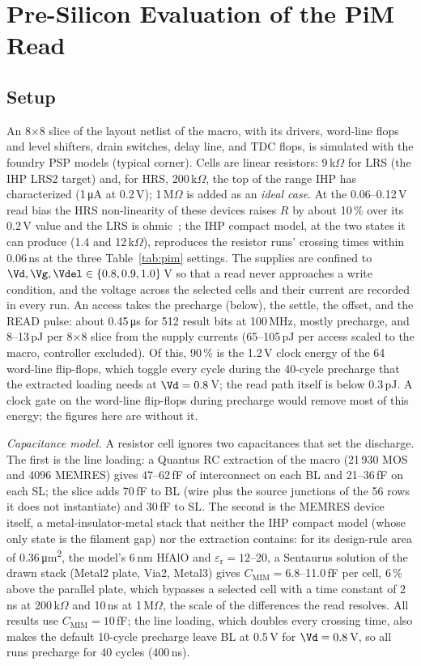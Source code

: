 \section{Pre-Silicon Evaluation of the PiM Read}
\label{sec:results}
\subsection{Setup}
An 8$\times$8 slice of the layout netlist of the macro, with its drivers, word-line flops and level
shifters, drain switches, delay line, and TDC flops, is simulated with the foundry PSP models
(typical corner). Cells are linear resistors:
9\,k$\Omega$ for LRS (the IHP LRS2 target) and, for HRS, 200\,k$\Omega$, the top of the
range IHP has characterized (1\,\si{\micro\ampere} at 0.2\,V); 1\,M$\Omega$ is added as an \emph{ideal case}. At the 0.06--0.12\,V read bias the HRS non-linearity of
these devices raises $R$ by about 10\,\% over its 0.2\,V value and the LRS is ohmic~\cite{zanotti2026model}; the IHP
compact model, at the two states it can produce (1.4 and 12\,k$\Omega$), reproduces the resistor
runs' crossing times within 0.06\,ns at the three Table~\ref{tab:pim} settings.
The supplies are confined to
$\Vd,\Vg,\Vdel\in\{0.8,0.9,1.0\}$\,V so that a read never approaches a write condition, and the
voltage across the selected cells and their current are recorded in every run. An access takes
the precharge (below), the settle, the offset, and the READ pulse: about 0.45\,\si{\micro\second}
for 512 result bits at 100\,MHz, mostly precharge, and 8--13\,pJ per 8$\times$8 slice from the supply currents (65--105\,pJ per access
scaled to the macro, controller excluded). Of this, 90\,\% is the 1.2\,V clock energy of the 64 word-line flip-flops, which toggle every
cycle during the 40-cycle precharge that the extracted loading needs at $\Vd=0.8$\,V; the read path itself is below 0.3\,pJ. A clock gate on the word-line flip-flops during
precharge would remove most of this energy; the figures here are without it.

\textit{Capacitance model.} A resistor cell ignores two capacitances that set the discharge. The
first is the line loading: a Quantus RC extraction of the macro (21\,930 MOS and 4096 MEMRES)
gives 47--62\,fF of interconnect on each BL and 21--36\,fF on each SL; the slice adds 70\,fF to
BL (wire plus the source junctions of the 56 rows it does not instantiate) and 30\,fF to SL. The
second is the MEMRES device itself, a metal-insulator-metal stack that neither the IHP compact
model (whose only state is the filament gap) nor the extraction contains: for its design-rule area of 0.36\,\si{\micro\meter\squared}, the model's
6\,nm HfAlO and $\varepsilon_\mathrm{r}=12$--20, a Sentaurus solution of the drawn stack (Metal2
plate, Via2, Metal3) gives $C_\mathrm{MIM}=6.8$--11.0\,fF per cell, 6\,\% above the parallel plate,
which bypasses a selected cell with a time constant of 2\,ns at 200\,k$\Omega$ and 10\,ns at
1\,M$\Omega$, the scale of the differences the read resolves. All results use
$C_\mathrm{MIM}=10$\,fF; the line
loading, which doubles every crossing time, also makes the default 10-cycle precharge leave BL
at 0.5\,V for $\Vd=0.8$\,V, so all runs precharge for 40 cycles (400\,ns).

